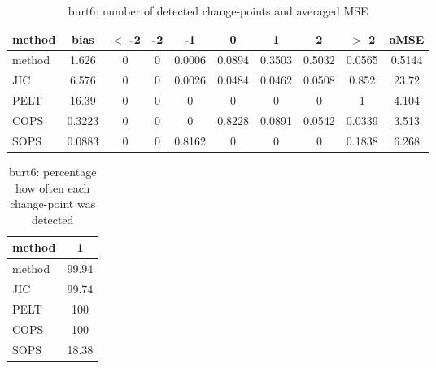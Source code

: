 \begin{table}[ht]
\centering
\begin{tabular}{l|c|ccccccc|c}
  \hline
method & bias & $<$ -2 & -2 & -1 & 0 & 1 & 2 & $>$ 2 & aMSE \\ 
  \hline
method & 1.626 &     0 &     0 & 0.0006 & 0.0894 & 0.3503 & 0.5032 & 0.0565 & 0.5144 \\ 
  JIC & 6.576 &     0 &     0 & 0.0026 & 0.0484 & 0.0462 & 0.0508 & 0.852 & 23.72 \\ 
  PELT & 16.39 &     0 &     0 &     0 &     0 &     0 &     0 &     1 & 4.104 \\ 
  COPS & 0.3223 &     0 &     0 &     0 & 0.8228 & 0.0891 & 0.0542 & 0.0339 & 3.513 \\ 
  SOPS & 0.0883 &     0 &     0 & 0.8162 &     0 &     0 &     0 & 0.1838 & 6.268 \\ 
   \hline
\end{tabular}
\caption{burt6: number of detected change-points and averaged MSE} 
\label{tab:burt6Njumps}
\end{table}
\begin{table}[ht]
\centering
\begin{tabular}{l|c}
  \hline
method & 1 \\ 
  \hline
method &  99.94 \\ 
  JIC &  99.74 \\ 
  PELT &    100 \\ 
  COPS &    100 \\ 
  SOPS &  18.38 \\ 
   \hline
\end{tabular}
\caption{burt6: percentage how often each change-point was detected} 
\label{tab:burt6Detections}
\end{table}
